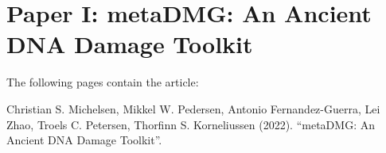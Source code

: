\chapter{Paper I: metaDMG: An Ancient DNA Damage Toolkit}

The following pages contain the article:
\vspace*{1cm}


Christian S. Michelsen, Mikkel W. Pedersen, Antonio Fernandez-Guerra, Lei Zhao, Troels C. Petersen, Thorfinn S. Korneliussen (2022). ``metaDMG: An Ancient DNA Damage Toolkit''.


\clearpage
% 



